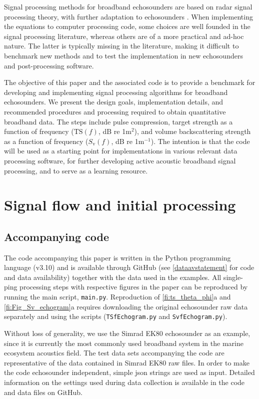 \documentclass[preprint,12pt,TurnOnLineNumbers]{JASAnew}
\newcommand{\ek}{Simrad EK80}
\newcommand{\freqsym}{f}
\newcommand{\ts}{\textrm{TS}}
\newcommand{\sv}{S_{\textrm{v}}}
\newcommand{\code}[1]{\texttt{#1}}
\begin{document}
Signal processing methods for broadband echosounders \citep{stanton2008} are based on radar signal processing theory, with further adaptation to echosounders \citep{lavery2017,bassett_broadband_2018}. When implementing the equations to computer processing code, some choices are well founded in the signal processing literature, whereas others are of a more practical and ad-hoc nature. The latter is typically missing in the literature, making it difficult to benchmark new methods and to test the implementation in new echosounders and post-processing software. 

The objective of this paper and the associated code is to provide a benchmark for developing and implementing signal processing algorithms for broadband echosounders. We present the design goals, implementation details, and recommended procedures and processing required to obtain quantitative broadband data. The steps include pulse compression, target strength as a function of frequency ($\ts(\freqsym)$, dB re 1m$^2$), and volume backscattering strength as a function of frequency ($\sv(\freqsym)$, dB re 1m$^{-1}$). The intention is that the code will be used as a starting point for implementations in various relevant data processing software, for further developing active acoustic broadband signal processing, and to serve as a learning resource. 

\section{Signal flow and initial processing}

\subsection{Accompanying code}
The code  accompanying this paper is written in the Python programming language (v3.10) and is available through GitHub (see \autoref{dataavstatement} for code and data availability) together with the data used in the examples. All single-ping processing steps with respective figures in the paper can be reproduced by running the main script, \code{main.py}. Reproduction of \autoref{fi:ts_theta_phi}a and \autoref{fi:Fig_Sv_echogram}a requires downloading the original echosounder raw data separately and using the scripts (\code{TSfEchogram.py} and \code{SvfEchogram.py}). 

Without loss of generality, we use the \ek{} echosounder as an example, since it is currently the most commonly used broadband system in the marine ecosystem acoustics field. The test data sets accompanying the code are representative of the data contained in Simrad EK80 raw files. In order to make the code echosounder independent, simple json strings are used as input. Detailed information on the settings used during data collection is available in the code and data files on GitHub.
\end{document}
